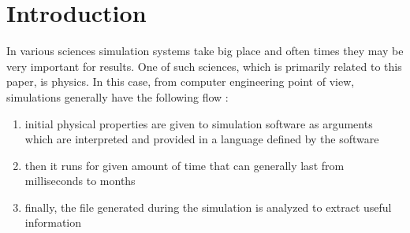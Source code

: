 \documentclass[10pt,journal,final,letterpaper,twocolumn]{IEEEtran}
\begin{document}

\section{Introduction}\label{sc:intro}

In various sciences simulation systems take big place and often times they may be very important for results. One of such sciences, which is primarily related to this paper, is physics. In this case, from computer engineering point of view, simulations generally have the following flow \cite{mainPaper}:

\vspace{5mm}

{\small
\begin{enumerate}
	\item initial physical properties are given to simulation software as arguments which are interpreted and provided in a language defined by the software
	\item then it runs for given amount of time that can generally last from milliseconds to months
	\item finally, the file generated during the simulation is analyzed to extract useful information
\end{enumerate}
}

\vspace{3mm}
\end{document}
